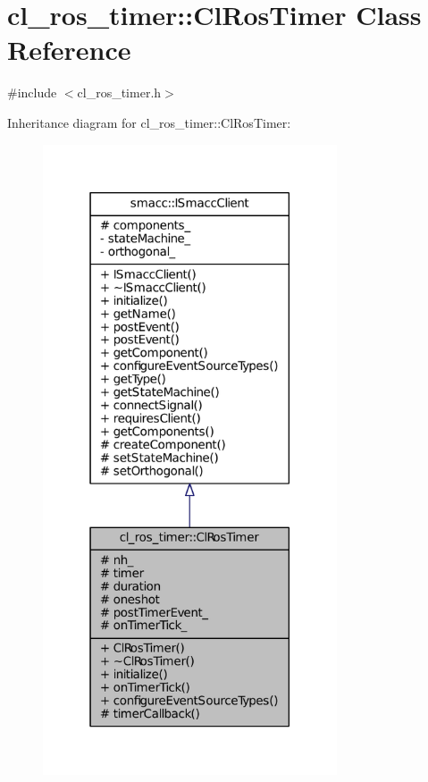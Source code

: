 \hypertarget{classcl__ros__timer_1_1ClRosTimer}{}\section{cl\+\_\+ros\+\_\+timer\+:\+:Cl\+Ros\+Timer Class Reference}
\label{classcl__ros__timer_1_1ClRosTimer}


{\ttfamily \#include $<$cl\+\_\+ros\+\_\+timer.\+h$>$}



Inheritance diagram for cl\+\_\+ros\+\_\+timer\+:\+:Cl\+Ros\+Timer\+:
\nopagebreak
\begin{figure}[H]
\begin{center}
\leavevmode
\includegraphics[width=247pt]{classcl__ros__timer_1_1ClRosTimer__inherit__graph}
\end{center}
\end{figure}


